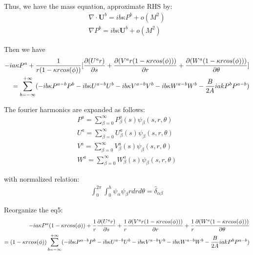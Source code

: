 \documentclass{Note}
\begin{document}
Thus, we have the mass equation,  approximate RHS by:
\begin{equation}
\begin{aligned}
\nabla \cdot \textbf{U}^b=ib\kappa P^b+o(M^2)\\
\nabla P^b=ib\kappa \textbf{U}^b+o(M^2)
\end{aligned}
\end{equation}

 Then we have
\begin{equation}
\begin{aligned}
-ia\kappa P^a+{1\over r(1-\kappa r cos(\phi))} [{\partial(U^a r)\over \partial s}+{\partial(V^a r(1-\kappa r cos(\phi)))\over \partial r}+{\partial(W^a (1-\kappa r cos(\phi)))\over \partial \theta}]\\
=\sum_{b=-\infty}^{+\infty}(-ib\kappa P^{a-b} P^{b} -ib\kappa U^{a-b} U^{b}-ib\kappa V^{a-b} V^{b}-ib\kappa W^{a-b} W^{b}  - {B\over {2A}}iakP^bP^{a-b})
\end{aligned}
\end{equation}

The fourier harmonics are expanded as follows:
\begin{equation}
\begin{aligned}
P^a=\sum_{\beta=0}^\infty P_\beta^a (s) \psi_\beta(s,r,\theta)\\
U^a=\sum_{\beta=0}^\infty U_\beta^a (s) \psi_\beta(s,r,\theta)\\
V^a=\sum_{\beta=0}^\infty V_\beta^a (s) \psi_\beta(s,r,\theta)\\
W^a=\sum_{\beta=0}^\infty W_\beta^a (s) \psi_\beta(s,r,\theta)
\end{aligned}
\end{equation}

with normalized relation:
\begin{equation}
\begin{aligned}
\int_0^{2\pi}\int_0^h \psi_\alpha\psi_\beta r dr d\theta=\widehat{\delta }_{\alpha\beta}
\end{aligned}
\end{equation}

Reorganize the eq5:
\begin{equation}
\begin{aligned}
-ia\kappa P^a(1-\kappa r cos(\phi))+{1\over r} {\partial(U^a r)\over \partial s}+{1\over r}{\partial(V^a r(1-\kappa r cos(\phi)))\over \partial r}+{1\over r}{\partial(W^a (1-\kappa r cos(\phi)))\over \partial \theta}\\
=(1-\kappa r cos(\phi))\sum_{b=-\infty}^{+\infty}(-ib\kappa P^{a-b} P^{b} -ib\kappa U^{a-b} U^{b}-ib\kappa V^{a-b} V^{b}-ib\kappa W^{a-b} W^{b}  - {B\over {2A}}iakP^bP^{a-b})
\end{aligned}
\end{equation}
\end{document}
